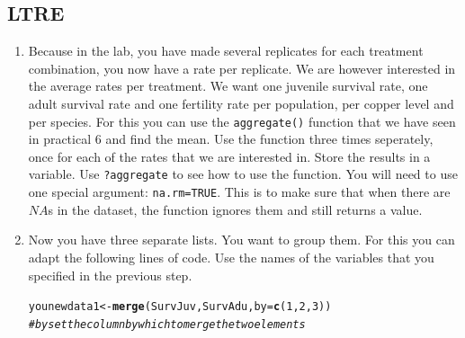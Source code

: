 \documentclass{article}\usepackage[]{graphicx}\usepackage[]{color}
\makeatletter
\newcommand{\hlnum}[1]{\textcolor[rgb]{0.686,0.059,0.569}{#1}}%
\newcommand{\hlcom}[1]{\textcolor[rgb]{0.678,0.584,0.686}{\textit{#1}}}%
\newcommand{\hlstd}[1]{\textcolor[rgb]{0.345,0.345,0.345}{#1}}%
\newcommand{\hlkwb}[1]{\textcolor[rgb]{0.69,0.353,0.396}{#1}}%
\newcommand{\hlkwc}[1]{\textcolor[rgb]{0.333,0.667,0.333}{#1}}%
\newcommand{\hlkwd}[1]{\textcolor[rgb]{0.737,0.353,0.396}{\textbf{#1}}}%
\newenvironment{kframe}{%
 \def\at@end@of@kframe{}%
 \ifinner\ifhmode%
  \def\at@end@of@kframe{\end{minipage}}%
  \begin{minipage}{\columnwidth}%
 \fi\fi%
 \def\FrameCommand##1{\hskip\@totalleftmargin \hskip-\fboxsep
 \colorbox{shadecolor}{##1}\hskip-\fboxsep
     \hskip-\linewidth \hskip-\@totalleftmargin \hskip\columnwidth}%
 \MakeFramed {\advance\hsize-\width
   \@totalleftmargin\z@ \linewidth\hsize
   \@setminipage}}%
 {\par\unskip\endMakeFramed%
 \at@end@of@kframe}
\newenvironment{knitrout}{}{} %
\makeatother
\begin{document}
\subsection{LTRE}
\begin{enumerate}
\item Because in the lab, you have made several replicates for each treatment combination, you now have a rate per replicate. We are however interested in the average rates per treatment. We want one juvenile survival rate, one adult survival rate and one fertility rate per population, per copper level and per species. For this you can use the \texttt{aggregate()} function that we have seen in practical $6$ and find the mean. Use the function three times seperately, once for each of the rates that we are interested in. Store the results in a variable. Use \texttt{?aggregate} to see how to use the function. You will need to use one special argument: \texttt{na.rm=TRUE}. This is to make sure that when there are $NA$s in the dataset, the function ignores them and still returns a value.
\item Now you have three separate lists. You want to group them. For this you can adapt the following lines of code. Use the names of the variables that you specified in the previous step.
\begin{knitrout}
\color{fgcolor}\begin{kframe}
\begin{alltt}
\hlstd{younewdata1}\hlkwb{<-}\hlkwd{merge}\hlstd{(SurvJuv, SurvAdu,} \hlkwc{by}\hlstd{=}\hlkwd{c}\hlstd{(}\hlnum{1}\hlstd{,}\hlnum{2}\hlstd{,}\hlnum{3}\hlstd{))}
\hlcom{#by set the column by which to merge the two elements}


\end{alltt}
\end{kframe}
\end{knitrout}
\end{enumerate}
\end{document}

